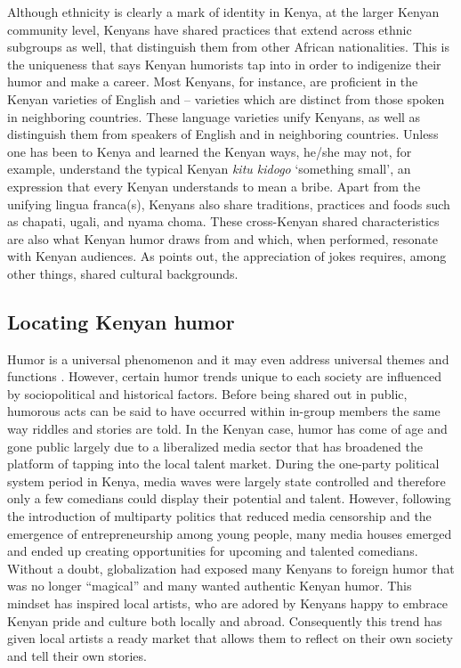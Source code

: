 \documentclass[output=paper]{langsci/langscibook}
\begin{document}
Although ethnicity is clearly a mark of identity in Kenya, at the larger Kenyan community level, Kenyans have shared practices that extend across ethnic subgroups as well, that distinguish them from other African nationalities. This is the uniqueness that \citet[5]{Tumusiime2013} says Kenyan humorists tap into in order to indigenize their humor and make a career. Most Kenyans, for instance, are proficient in the Kenyan varieties of English and  – varieties which are distinct from those spoken in neighboring countries. These language varieties unify Kenyans, as well as distinguish them from speakers of English and  in neighboring countries. Unless one has been to Kenya and learned the Kenyan ways, he/she may not, for example, understand the typical Kenyan \textit{kitu kidogo }‘something small’, an expression that every Kenyan understands to mean a bribe. Apart from the unifying lingua franca(s), Kenyans also share traditions, practices and foods such as chapati, ugali, and nyama choma. These cross-Kenyan shared characteristics are also what Kenyan humor draws from and which, when performed, resonate with Kenyan audiences. As \citet{Chiaro1992} points out, the appreciation of jokes requires, among other things, shared cultural backgrounds.


\subsection{Locating Kenyan humor }\label{sec:muaka:1.2}

Humor is a universal phenomenon and it may even address universal themes and functions \citep[xiii]{NorrickChiaro2009}. However, certain humor trends unique to each society are influenced by sociopolitical and historical factors. Before being shared out in public, humorous acts can be said to have occurred within in-group members the same way riddles and stories are told. In the Kenyan case, humor has come of age and gone public largely due to a liberalized media sector that has broadened the platform of tapping into the local talent market. During the one-party political system period in Kenya, media waves were largely state controlled and therefore only a few comedians could display their potential and talent. However, following the introduction of multiparty politics that reduced media censorship and the emergence of entrepreneurship among young people, many media houses emerged and ended up creating opportunities for upcoming and talented comedians. Without a doubt, globalization had exposed many Kenyans to foreign humor that was no longer “magical” and many wanted authentic Kenyan humor. This mindset has inspired local artists, who are adored by Kenyans happy to embrace Kenyan pride and culture both locally and abroad. Consequently this trend has given local artists a ready market that allows them to reflect on their own society and tell their own stories. 
\end{document}
